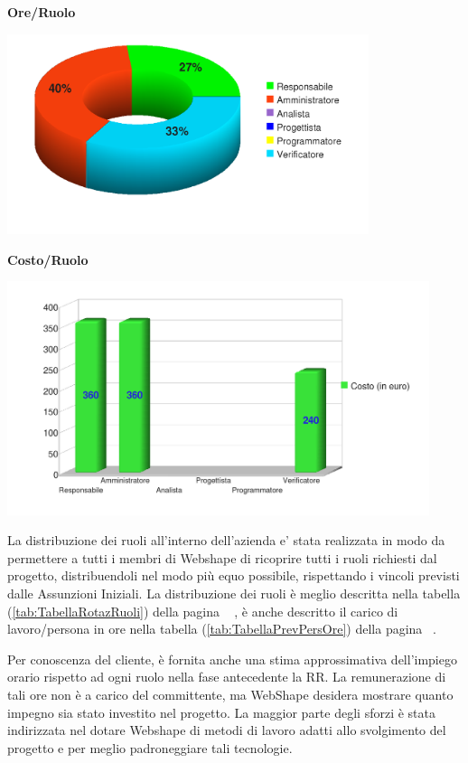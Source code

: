\begin{center}\textbf{Ore/Ruolo}
\end{center}
\includegraphics[width=300pt]{RQ-RA_Ore}
\newpage
\begin{center}\textbf{Costo/Ruolo}
\end{center}
\includegraphics[width=350pt]{RQ-RA_Costi}

La distribuzione dei ruoli all'interno dell'azienda e' stata realizzata in modo da permettere a tutti i membri di Webshape di ricoprire tutti i ruoli richiesti dal progetto, distribuendoli nel modo pi\`u equo possibile, rispettando i vincoli previsti dalle Assunzioni Iniziali. La distribuzione dei ruoli \`e meglio descritta nella tabella (\ref{tab:TabellaRotazRuoli}) della pagina ~\pageref{tab:TabellaRotazRuoli} , \`e anche descritto il carico di lavoro/persona in ore nella tabella (\ref{tab:TabellaPrevPersOre}) della pagina ~\pageref{tab:TabellaPrevPersOre}.

Per conoscenza del cliente, \`e fornita anche una stima approssimativa dell'impiego orario rispetto ad ogni ruolo nella fase antecedente la RR. La remunerazione di tali ore non \`e a carico del committente, ma WebShape desidera mostrare quanto impegno sia stato investito nel progetto. La maggior parte degli sforzi \`e stata indirizzata nel dotare Webshape di metodi di lavoro adatti allo svolgimento del progetto e per meglio padroneggiare tali tecnologie.\\

